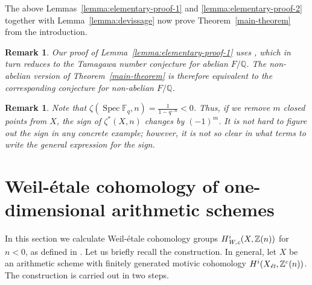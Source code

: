 \documentclass{article}
\DeclareMathOperator{\Spec}{Spec}
\newcommand{\FF}{\mathbb{F}}
\newcommand{\QQ}{\mathbb{Q}}
\newcommand{\ZZ}{\mathbb{Z}}
\newcommand{\et}{\text{\it \'{e}t}}
\newcommand{\Wc}{\text{\it W,c}}
\theoremstyle{myplain}
\theoremstyle{mydefinition}
\newtheorem{remark}[theorem]{Remark}
\begin{document}
The above Lemmas~\ref{lemma:elementary-proof-1} and
\ref{lemma:elementary-proof-2} together with Lemma~\ref{lemma:devissage} now
prove Theorem~\ref{main-theorem} from the introduction.

\begin{remark}
  \label{rmk:TNC}
  Our proof of Lemma~\ref{lemma:elementary-proof-1} uses
  \cite[Proposition~5.35]{Flach-Morin-2018}, which in turn reduces to the
  Tamagawa number conjecture for abelian $F/\QQ$. The non-abelian version of
  Theorem~\ref{main-theorem} is therefore equivalent to the corresponding
  conjecture for non-abelian $F/\QQ$.
\end{remark}

\begin{remark}
  Note that $\zeta (\Spec \FF_q, n) = \frac{1}{1 - q^{-n}} < 0$. Thus, if we
  remove $m$ closed points from $X$, the sign of $\zeta^* (X,n)$ changes by
  $(-1)^m$. It is not hard to figure out the sign in any concrete example;
  however, it is not so clear in what terms to write the general expression for
  the sign.
\end{remark}


\section{Weil-\'{e}tale cohomology of one-dimensional arithmetic schemes}
\label{sec:Weil-etale-cohomology-of-X}

In this section we calculate Weil-\'{e}tale cohomology groups
$H^i_\Wc (X, \ZZ(n))$ for ${n < 0}$, as defined in
\cite{Beshenov-Weil-etale-1}. Let us briefly recall the construction.
In general, let $X$ be an arithmetic scheme with finitely generated motivic
cohomology $H^i (X_\et, \ZZ^c(n))$. The construction is carried out in two
steps.
\end{document}
